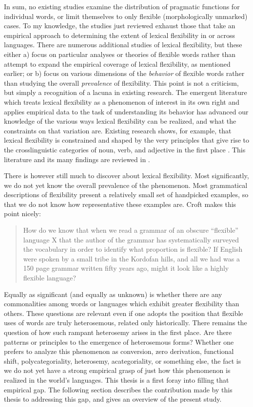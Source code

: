 In sum, no existing studies examine the distribution of pragmatic functions for individual words, or limit themselves to only flexible (morphologically unmarked) cases. To my knowledge, the studies just reviewed exhaust those that take an empirical approach to determining the extent of lexical flexibility in or across languages. There are numerous additional studies of lexical flexibility, but these either a) focus on particular analyses or theories of flexible words rather than attempt to expand the empirical coverage of lexical flexibility, as mentioned earlier; or b) focus on various dimensions of the \emph{behavior} of flexible words rather than studying the overall \emph{prevalence} of flexibility. This point is not a criticism, but simply a recognition of a lacuna in existing research. The emergent literature which treats lexical flexibility as a phenomenon of interest in its own right and applies empirical data to the task of understanding its behavior has advanced our knowledge of the various ways lexical flexibility can be realized, and what the constraints on that variation are. Existing research shows, for example, that lexical flexibility is constrained and shaped by the very principles that give rise to the crosslinguistic categories of noun, verb, and adjective in the first place . This literature and its many findings are reviewed in .

There is however still much to discover about lexical flexibility. Most significantly, we do not yet know the overall prevalence of the phenomenon. Most grammatical descriptions of flexibility present a relatively small set of handpicked examples, so that we do not know how representative these examples are. Croft  makes this point nicely:

\blockquote[]{How do we know that when we read a grammar of an obscure \enquote{flexible} language X that the author of the grammar has systematically surveyed the vocabulary in order to identify what proportion is flexible? If English were spoken by a small tribe in the Kordofan hills, and all we had was a 150 page grammar written fifty years ago, might it look like a highly flexible language?}

\noindent Equally as significant (and equally as unknown) is whether there are any commonalities among words or languages which exhibit greater flexibility than others. These questions are relevant even if one adopts the position that flexible uses of words are truly heterosemous, related only historically. There remains the question of how such rampant heterosemy arises in the first place. Are there patterns or principles to the emergence of heterosemous forms? Whether one prefers to analyze this phenomenon as conversion, zero derivation, functional shift, polycategoriality, heterosemy, acategoriality, or something else, the fact is we do not yet have a strong empirical grasp of just how this phenomenon is realized in the world's languages. This thesis is a first foray into filling that empirical gap. The following section describes the contribution made by this thesis to addressing this gap, and gives an overview of the present study.

